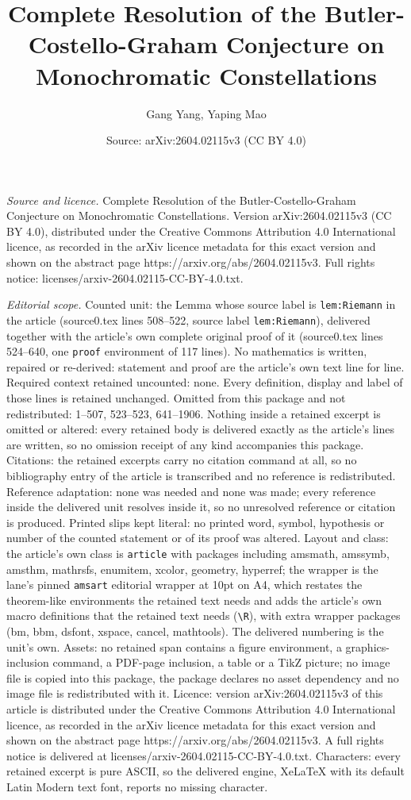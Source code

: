 \documentclass[10pt,a4paper]{amsart}
\title[Complete Resolution of the Butler-Costello-Graham Conjecture]{Complete Resolution of the Butler-Costello-Graham Conjecture on Monochromatic Constellations}
\author{Gang Yang, Yaping Mao}
\date{Source: arXiv:2604.02115v3 (CC BY 4.0)}
\begin{document}
\maketitle

\noindent\emph{Source and licence.} Complete Resolution of the Butler-Costello-Graham Conjecture on Monochromatic Constellations. Version arXiv:2604.02115v3 (CC BY 4.0), distributed under the Creative Commons Attribution 4.0 International licence, as recorded in the arXiv licence metadata for this exact version and shown on the abstract page https://arxiv.org/abs/2604.02115v3. Full rights notice: licenses/arxiv-2604.02115-CC-BY-4.0.txt.\par\smallskip

\noindent\textit{Editorial scope.} Counted unit: the Lemma whose source label is \texttt{lem:Riemann} in the article (source0.tex lines 508--522, source label \texttt{lem:Riemann}), delivered together with the article's own complete original proof of it (source0.tex lines 524--640, one \texttt{proof} environment of 117 lines). No mathematics is written, repaired or re-derived: statement and proof are the article's own text line for line. Required context retained uncounted: none. Every definition, display and label of those lines is retained unchanged. Omitted from this package and not redistributed: 1--507, 523--523, 641--1906. Nothing inside a retained excerpt is omitted or altered: every retained body is delivered exactly as the article's lines are written, so no omission receipt of any kind accompanies this package. Citations: the retained excerpts carry no citation command at all, so no bibliography entry of the article is transcribed and no reference is redistributed. Reference adaptation: none was needed and none was made; every reference inside the delivered unit resolves inside it, so no unresolved reference or citation is produced. Printed slips kept literal: no printed word, symbol, hypothesis or number of the counted statement or of its proof was altered. Layout and class: the article's own class is \texttt{article} with packages including amsmath, amssymb, amsthm, mathrsfs, enumitem, xcolor, geometry, hyperref; the wrapper is the lane's pinned \texttt{amsart} editorial wrapper at 10pt on A4, which restates the theorem-like environments the retained text needs and adds the article's own macro definitions that the retained text needs (\texttt{\textbackslash R}), with extra wrapper packages (bm, bbm, dsfont, xspace, cancel, mathtools). The delivered numbering is the unit's own. Assets: no retained span contains a figure environment, a graphics-inclusion command, a PDF-page inclusion, a table or a TikZ picture; no image file is copied into this package, the package declares no asset dependency and no image file is redistributed with it. Licence: version arXiv:2604.02115v3 of this article is distributed under the Creative Commons Attribution 4.0 International licence, as recorded in the arXiv licence metadata for this exact version and shown on the abstract page https://arxiv.org/abs/2604.02115v3. A full rights notice is delivered at licenses/arxiv-2604.02115-CC-BY-4.0.txt. Characters: every retained excerpt is pure ASCII, so the delivered engine, XeLaTeX with its default Latin Modern text font, reports no missing character.
\end{document}
